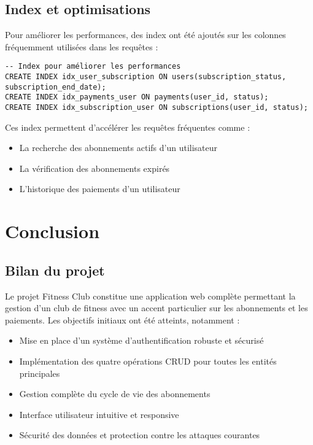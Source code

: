 \documentclass[12pt,a4paper]{report}
\begin{document}
\section{Index et optimisations}

Pour améliorer les performances, des index ont été ajoutés sur les colonnes fréquemment utilisées dans les requêtes :

\begin{lstlisting}[style=sqlStyle, caption=Index pour l'optimisation des performances]
-- Index pour améliorer les performances
CREATE INDEX idx_user_subscription ON users(subscription_status, subscription_end_date);
CREATE INDEX idx_payments_user ON payments(user_id, status);
CREATE INDEX idx_subscription_user ON subscriptions(user_id, status);
\end{lstlisting}

Ces index permettent d'accélérer les requêtes fréquentes comme :
\begin{itemize}
    \item La recherche des abonnements actifs d'un utilisateur
    \item La vérification des abonnements expirés
    \item L'historique des paiements d'un utilisateur
\end{itemize}

\chapter{Conclusion}

\section{Bilan du projet}

Le projet Fitness Club constitue une application web complète permettant la gestion d'un club de fitness avec un accent particulier sur les abonnements et les paiements. Les objectifs initiaux ont été atteints, notamment :

\begin{itemize}
    \item Mise en place d'un système d'authentification robuste et sécurisé
    \item Implémentation des quatre opérations CRUD pour toutes les entités principales
    \item Gestion complète du cycle de vie des abonnements
    \item Interface utilisateur intuitive et responsive
    \item Sécurité des données et protection contre les attaques courantes
\end{itemize}
\end{document}
